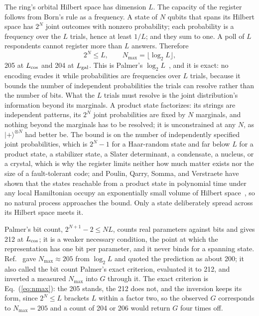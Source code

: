\documentclass[aps,prd,twocolumn,superscriptaddress,nofootinbib]{revtex4-2}
\begin{document}
The ring's orbital Hilbert space has dimension $L$. The capacity of the register follows from Born's rule as a frequency. A state of $N$ qubits that spans its Hilbert space has $2^N$ joint outcomes with nonzero probability; each probability is a frequency over the $L$ trials, hence at least $1/L$; and they sum to one. A poll of $L$ respondents cannot register more than $L$ answers. Therefore
\begin{equation}
2^N \le L, \qquad N_{\max} = \lfloor \log_2 L \rfloor ,
\label{eq:nmax}
\end{equation}
205 at $L_{\rm cos}$ and 204 at $L_{\rm gal}$. This is Palmer's $\log_2 L$~\cite{palmer2026}, and it is exact: no encoding evades it while probabilities are frequencies over $L$ trials, because it bounds the number of independent probabilities the trials can resolve rather than the number of bits. What the $L$ trials must resolve is the joint distribution's information beyond its marginals. A product state factorizes: its strings are independent patterns, its $2^N$ joint probabilities are fixed by $N$ marginals, and nothing beyond the marginals has to be resolved; it is unconstrained at any $N$, as $|{+}\rangle^{\otimes N}$ had better be. The bound is on the number of independently specified joint probabilities, which is $2^N - 1$ for a Haar-random state and far below $L$ for a product state, a stabilizer state, a Slater determinant, a condensate, a nucleus, or a crystal, which is why the register limits neither how much matter exists nor the size of a fault-tolerant code; and Poulin, Qarry, Somma, and Verstraete have shown that the states reachable from a product state in polynomial time under any local Hamiltonian occupy an exponentially small volume of Hilbert space~\cite{poulin2011}, so no natural process approaches the bound. Only a state deliberately spread across its Hilbert space meets it.

Palmer's bit count, $2^{N+1}-2 \le NL$, counts real parameters against bits and gives 212 at $L_{\rm cos}$; it is a weaker necessary condition, the point at which the representation has one bit per parameter, and it never binds for a spanning state. Ref.~\cite{korytko2026} gave $N_{\max}\approx205$ from $\log_2 L$ and quoted the prediction as about 200; it also called the bit count Palmer's exact criterion, evaluated it to 212, and inverted a measured $N_{\max}$ into $G$ through it. The exact criterion is Eq.~(\ref{eq:nmax}): the 205 stands, the 212 does not, and the inversion keeps its form, since $2^N \le L$ brackets $L$ within a factor two, so the observed $G$ corresponds to $N_{\max} = 205$ and a count of 204 or 206 would return $G$ four times off.
\end{document}
